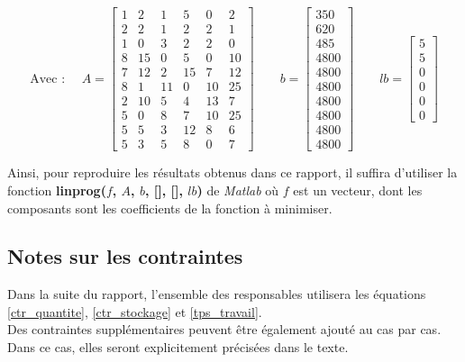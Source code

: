 \documentclass[paper=a4, fontsize=11pt]{report}
\numberwithin{equation}{section}		%
\numberwithin{figure}{section}			%
\numberwithin{table}{section}				%
\renewcommand{\bf}[1]{\textbf{#1}}
\begin{document}
\[ \text{Avec : } \quad A = \begin{bmatrix}
1 & 2 & 1 & 5 & 0 & 2 \\ 
2 & 2 & 1 & 2 & 2 & 1 \\ 
1 & 0 & 3 & 2 & 2 & 0 \\ 
8 & 15 & 0 & 5 & 0 & 10 \\ 
7 & 12 & 2 & 15 & 7 & 12 \\ 
8 & 1 & 11 & 0 & 10 & 25 \\ 
2 & 10 & 5 & 4 & 13 & 7 \\ 
5 & 0 & 8 & 7 & 10 & 25 \\ 
5 & 5 & 3 & 12 & 8 & 6 \\ 
5 & 3 & 5 & 8 & 0 & 7 
\end{bmatrix} \quad \quad
b = \begin{bmatrix}
350 \\ 
620 \\ 
485 \\ 
4800 \\ 
4800 \\ 
4800 \\ 
4800 \\ 
4800 \\ 
4800 \\ 
4800
\end{bmatrix} \quad \quad
lb = \begin{bmatrix}
5 \\
5 \\
0 \\
0 \\
0 \\
0
\end{bmatrix} 
  \]

Ainsi, pour reproduire les résultats obtenus dans ce rapport, il suffira d'utiliser la fonction \bf{linprog($f$, $A$, $b$, [], [], $lb$)} de \textit{Matlab} où $f$ est un vecteur, dont les composants sont les coefficients de la fonction à minimiser.

\begin{shaded}
\vspace{-0.5cm}

\subsection*{Notes sur les contraintes}
Dans la suite du rapport, l'ensemble des responsables utilisera les équations \eqref{ctr_quantite}, \eqref{ctr_stockage} et \eqref{tps_travail}. \\

Des contraintes supplémentaires peuvent être également ajouté au cas par cas. Dans ce cas, elles seront explicitement précisées dans le texte.
\end{shaded}
\end{document}
